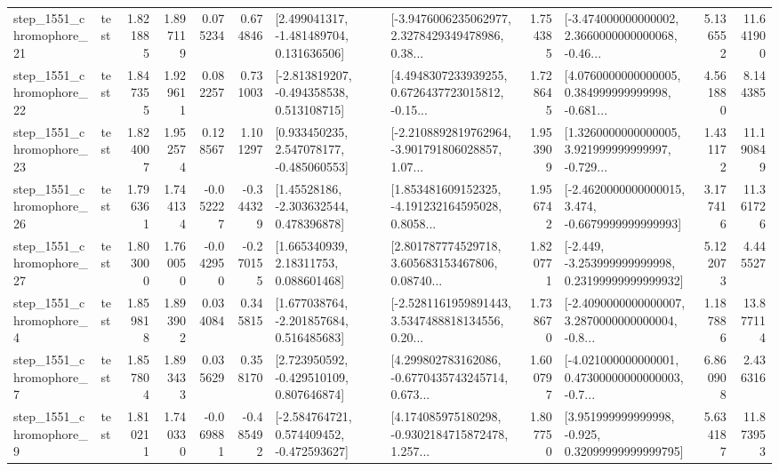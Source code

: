 \begin{tabular}{llrrrrllrlrr}
 step\_1551\_chromophore\_21 &      test &      1.821885 &    1.897119 &      0.075234 &  0.674846 &    [2.499041317, -1.481489704, 0.131636506] &  [-3.9476006235062977, 2.3278429349478986, 0.38... &       1.754385 &  [-3.474000000000002, 2.3660000000000068, -0.46... &            5.136552 &         11.641900 \\
 step\_1551\_chromophore\_22 &      test &      1.847355 &    1.929611 &      0.082257 &  0.731003 &   [-2.813819207, -0.494358538, 0.513108715] &  [4.4948307233939255, 0.6726437723015812, -0.15... &       1.728645 &  [4.0760000000000005, 0.384999999999998, -0.681... &            4.561880 &          8.144385 \\
 step\_1551\_chromophore\_23 &      test &      1.824007 &    1.952574 &      0.128567 &  1.101297 &    [0.933450235, 2.547078177, -0.485060553] &  [-2.2108892819762964, -3.901791806028857, 1.07... &       1.953909 &  [1.3260000000000005, 3.921999999999997, -0.729... &            1.431172 &         11.190849 \\
 step\_1551\_chromophore\_26 &      test &      1.796361 &    1.744134 &     -0.052227 & -0.344329 &     [1.45528186, -2.303632544, 0.478396878] &  [1.853481609152325, -4.191232164595028, 0.8058... &       1.956742 &  [-2.4620000000000015, 3.474, -0.6679999999999993] &            3.177416 &         11.361726 \\
 step\_1551\_chromophore\_27 &      test &      1.803000 &    1.760050 &     -0.042950 & -0.270155 &      [1.665340939, 2.18311753, 0.088601468] &  [2.801787774529718, 3.605683153467806, 0.08740... &       1.820771 &  [-2.449, -3.253999999999998, 0.23199999999999932] &            5.122073 &          4.445527 \\
  step\_1551\_chromophore\_4 &      test &      1.859818 &    1.893902 &      0.034084 &  0.345815 &    [1.677038764, -2.201857684, 0.516485683] &  [-2.5281161959891443, 3.5347488818134556, 0.20... &       1.738670 &  [-2.4090000000000007, 3.2870000000000004, -0.8... &            1.187886 &         13.877114 \\
  step\_1551\_chromophore\_7 &      test &      1.857804 &    1.893433 &      0.035629 &  0.358170 &    [2.723950592, -0.429510109, 0.807646874] &  [4.299802783162086, -0.6770435743245714, 0.673... &       1.600797 &  [-4.021000000000001, 0.47300000000000003, -0.7... &            6.860908 &          2.436316 \\
  step\_1551\_chromophore\_9 &      test &      1.810211 &    1.740330 &     -0.069881 & -0.485492 &   [-2.584764721, 0.574409452, -0.472593627] &  [4.174085975180298, -0.9302184715872478, 1.257... &       1.807750 &   [3.951999999999998, -0.925, 0.32099999999999795] &            5.634187 &         11.873953 \\

\end{tabular}
